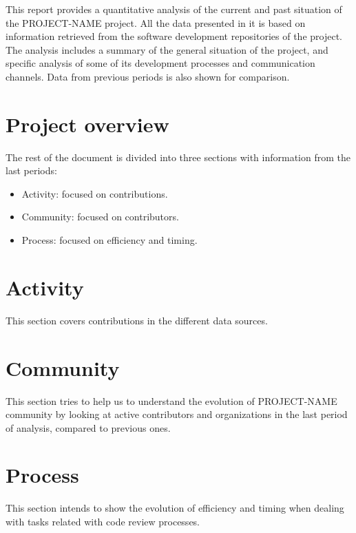 \documentclass[a4wide,4pt]{article}
\begin{document}
This report provides a quantitative analysis of the current and past situation of the PROJECT-NAME project. All the data presented in it is based on information retrieved from the software development repositories of the project. The analysis includes a summary of the general situation of the project, and specific analysis of some of its development processes and communication channels. Data from previous periods is also shown for comparison.

\newpage

\setcounter{tocdepth}{4}
\setcounter{secnumdepth}{4}
\tableofcontents

\newpage

\section{Project overview} \label{overview}



The rest of the document is divided into three sections with information from the last periods: 

\begin{itemize}
\item Activity: focused on contributions. 
\item Community: focused on contributors.
\item Process: focused on efficiency and timing.
\end{itemize}

\section{Activity} \label{activity}
This section covers contributions in the different data sources.\\




\section{Community} \label{community}
This section tries to help us to understand the evolution of PROJECT-NAME community by looking at active contributors and organizations in the last period of analysis, compared to previous ones.\\




\section{Process} \label{process}
This section intends to show the evolution of efficiency and timing when dealing with tasks related with code review processes.\\
	
\end{document}
